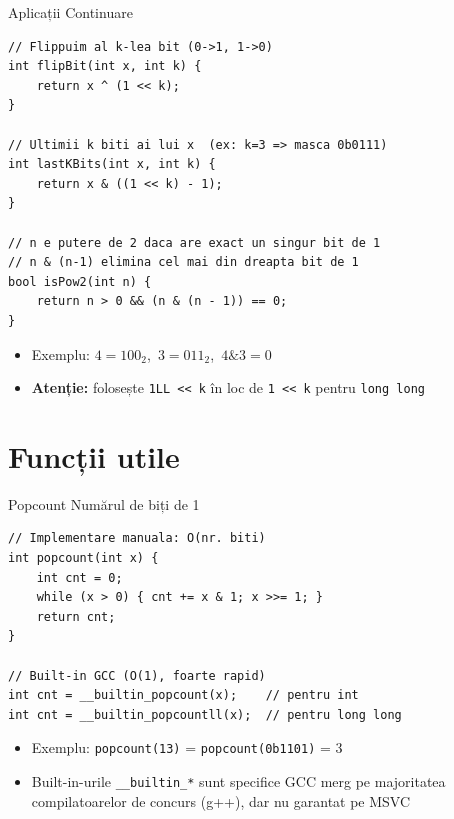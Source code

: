 \documentclass{beamer}
\begin{document}
\begin{frame}{Aplicații \textemdash{} Continuare}
  \begin{lstlisting}
// Flippuim al k-lea bit (0->1, 1->0)
int flipBit(int x, int k) {
    return x ^ (1 << k);
}

// Ultimii k biti ai lui x  (ex: k=3 => masca 0b0111)
int lastKBits(int x, int k) {
    return x & ((1 << k) - 1);
}

// n e putere de 2 daca are exact un singur bit de 1
// n & (n-1) elimina cel mai din dreapta bit de 1
bool isPow2(int n) {
    return n > 0 && (n & (n - 1)) == 0;
}
  \end{lstlisting}
  \begin{itemize}
    \item Exemplu: $4 = 100_2$,\ $3 = 011_2$,\ $4 \mathbin{\&} 3 = 0$ \checkmark
    \item \textbf{Atenție:} folosește \lstinline|1LL << k| în loc de \lstinline|1 << k| pentru \lstinline|long long|
  \end{itemize}
\end{frame}

\section{Funcții utile}

\begin{frame}{Popcount \textemdash{} Numărul de biți de 1}
  \begin{center}
  \begin{lstlisting}
// Implementare manuala: O(nr. biti)
int popcount(int x) {
    int cnt = 0;
    while (x > 0) { cnt += x & 1; x >>= 1; }
    return cnt;
}

// Built-in GCC (O(1), foarte rapid)
int cnt = __builtin_popcount(x);    // pentru int
int cnt = __builtin_popcountll(x);  // pentru long long
  \end{lstlisting}
  \end{center}
  \begin{itemize}
    \item Exemplu: \lstinline|popcount(13)| = \lstinline|popcount(0b1101)| = 3
    \item Built-in-urile \lstinline|__builtin_*| sunt specifice GCC \textemdash{} merg pe majoritatea compilatoarelor de concurs (g++), dar nu garantat pe MSVC
  \end{itemize}
\end{frame}
\end{document}
